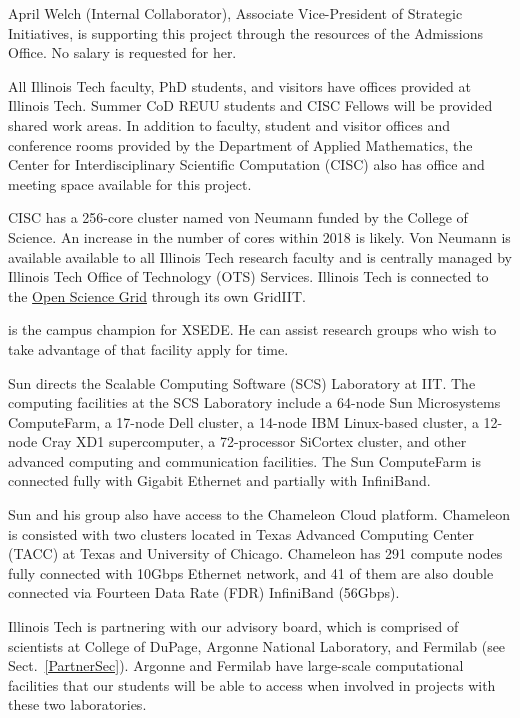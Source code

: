 \documentclass[11pt]{NSFamsart}
\begin{document}
April Welch (Internal Collaborator), Associate Vice-President of Strategic Initiatives, is supporting this project through the resources of the Admissions Office.  No salary is requested for her.

All Illinois Tech faculty, PhD students, and visitors have offices provided at Illinois Tech.  Summer CoD REUU students and CISC Fellows will be provided shared work areas.  In addition to faculty, student and visitor 
offices and conference rooms provided by the Department of Applied Mathematics, the Center for Interdisciplinary Scientific Computation (CISC) also has office and meeting space available for this project.

CISC has a 256-core cluster named von Neumann funded by the 
College of Science.  An increase in the number of cores within 2018 is likely. Von Neumann is available available to all Illinois Tech research faculty and is
centrally managed by Illinois Tech Office of Technology (OTS) Services.  Illinois Tech is connected to the \href{https://www.opensciencegrid.org}{Open Science Grid} through its own GridIIT.  

\JW is the campus champion for XSEDE.  He can assist research groups who wish to take advantage of that facility apply for time.

Sun directs the Scalable Computing Software (SCS) Laboratory at IIT. The computing facilities at the SCS Laboratory include a 64-node Sun Microsystems ComputeFarm, a 17-node Dell cluster, a 14-node IBM Linux-based cluster, a 12-node Cray XD1 supercomputer, a 72-processor SiCortex cluster, and other advanced computing and communication facilities. The Sun ComputeFarm is connected fully with Gigabit Ethernet and partially with InfiniBand.

Sun and his group also have access to the Chameleon Cloud platform. Chameleon is consisted with two clusters located in Texas Advanced Computing Center (TACC) at Texas and University of Chicago. Chameleon has 291 compute nodes fully connected with 10Gbps Ethernet network, and 41 of them are also double connected via Fourteen Data Rate (FDR) InfiniBand (56Gbps).



Illinois Tech is partnering with our advisory board, which is comprised of scientists at College of DuPage, Argonne National Laboratory, and Fermilab (see Sect.~\ref{PartnerSec}).  Argonne and Fermilab have large-scale computational facilities that our students will be able to access when involved in projects with these two laboratories.
\end{document}
